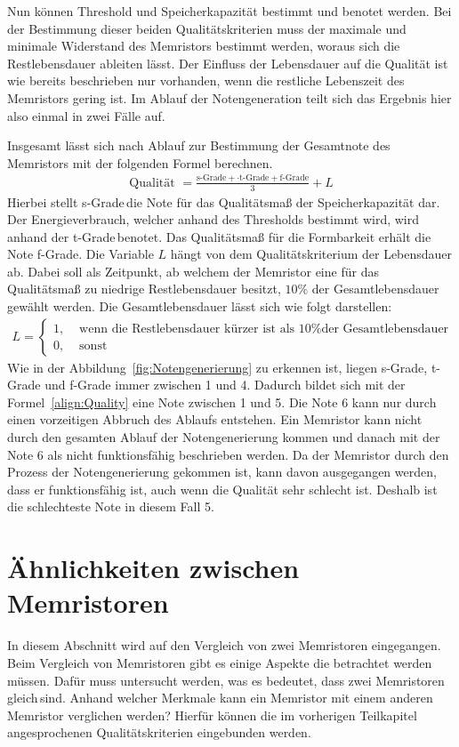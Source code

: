 Nun können Threshold und Speicherkapazität bestimmt und benotet werden. Bei der Bestimmung dieser beiden Qualitätskriterien muss der maximale und minimale Widerstand des Memristors bestimmt werden, woraus sich die Restlebensdauer ableiten lässt. Der Einfluss der Lebensdauer auf die Qualität ist wie bereits beschrieben nur vorhanden, wenn die restliche Lebenszeit des Memristors gering ist. Im Ablauf der Notengeneration teilt sich das Ergebnis hier also einmal in zwei Fälle auf.

Insgesamt lässt sich nach Ablauf zur Bestimmung der Gesamtnote des Memristors mit der folgenden Formel berechnen.
\begin{align*}
  \label{align:Quality}
  \text{Qualität } = \frac{\text{s-Grade} + \cdot \text{t-Grade} + \text{f-Grade}}{3} + L
\end{align*}
Hierbei stellt \glqq s-Grade\grqq\,die Note für das Qualitätsmaß der Speicherkapazität dar. Der Energieverbrauch, welcher anhand des Thresholds bestimmt wird, wird anhand der \glqq t-Grade\grqq\,benotet. Das Qualitätsmaß für die Formbarkeit erhält die Note \glqq f-Grade\grqq. Die Variable $L$ hängt von dem Qualitätskriterium der Lebensdauer ab. Dabei soll als Zeitpunkt, ab welchem der Memristor eine für das Qualitätsmaß zu niedrige Restlebensdauer besitzt, $10\%$ der Gesamtlebensdauer gewählt werden. Die Gesamtlebensdauer lässt sich wie folgt darstellen:
\begin{align*}
  L = \begin{cases}
    1, &\text{ wenn die Restlebensdauer kürzer ist als 10\% der Gesamtlebensdauer}\\
    0, &\text{ sonst}
  \end{cases}
\end{align*}
 Wie in der Abbildung~\ref{fig:Notengenerierung} zu erkennen ist, liegen s-Grade, t-Grade und f-Grade immer zwischen 1 und 4. Dadurch bildet sich mit der Formel~\ref{align:Quality} eine Note zwischen 1 und 5. Die Note 6 kann nur durch einen vorzeitigen Abbruch des Ablaufs entstehen. Ein Memristor kann nicht durch den gesamten Ablauf der Notengenerierung kommen und danach mit der Note 6 als nicht funktionsfähig beschrieben werden. Da der Memristor durch den Prozess der Notengenerierung gekommen ist, kann davon ausgegangen werden, dass er funktionsfähig ist, auch wenn die Qualität sehr schlecht ist. Deshalb ist die schlechteste Note in diesem Fall 5.

\section{Ähnlichkeiten zwischen Memristoren}
\label{sec:Vergleich}
In diesem Abschnitt wird auf den Vergleich von zwei Memristoren eingegangen. Beim Vergleich von Memristoren gibt es einige Aspekte die betrachtet werden müssen. Dafür muss untersucht werden, was es bedeutet, dass zwei Memristoren \glqq gleich\grqq\,sind. Anhand welcher Merkmale kann ein Memristor mit einem anderen Memristor verglichen werden? Hierfür können die im vorherigen Teilkapitel angesprochenen Qualitätskriterien eingebunden werden.

